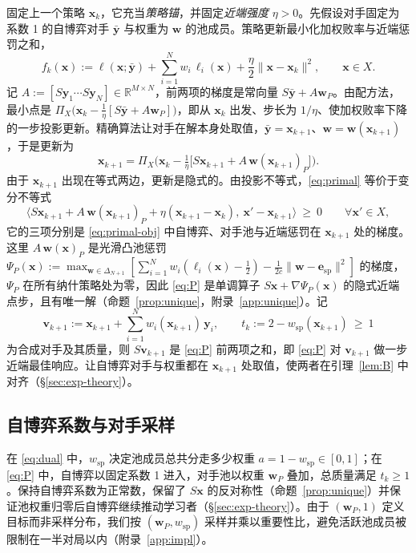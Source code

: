\documentclass{article}
\theoremstyle{plain}
\theoremstyle{remark}
\newcommand{\Proj}{\Pi}
\newcommand{\simplex}{\Delta}
\newcommand{\bx}{{\bm{x}}}
\newcommand{\by}{{\bm{y}}}
\newcommand{\bv}{{\bm{v}}}
\newcommand{\bw}{{\bm{w}}}
\newcommand{\be}{{\bm{e}}}
\newcommand{\esp}{\be_{\mathrm{sp}}}
\newcommand{\wsp}{w_{\mathrm{sp}}}
\begin{document}
固定上一个策略 $\bx_k$，它充当\emph{策略锚}，并固定\emph{近端强度} $\eta>0$。先假设对手固定为系数 1 的自博弈对手 $\bar{\by}$ 与权重为 $\bw$ 的池成员。策略更新最小化加权败率与近端惩罚之和，
\begin{equation}
f_k(\bx):=\ell(\bx;\bar{\by})+\sum_{i=1}^Nw_i\,\ell_i(\bx)+\frac\eta2\|\bx-\bx_k\|^2,\qquad \bx\in X .
\label{eq:primal-obj}
\end{equation}
记 $A:=[S\by_1\cdots S\by_N]\in\mathbb R^{M\times N}$，前两项的梯度是常向量 $S\bar{\by}+A\bw_P$。由配方法，最小点是 $\Proj_X\big(\bx_k-\tfrac1\eta[S\bar{\by}+A\bw_P]\big)$，即从 $\bx_k$ 出发、步长为 $1/\eta$、使加权败率下降的一步投影更新。精确算法让对手在解本身处取值，$\bar{\by}=\bx_{k+1}$、$\bw=\bw(\bx_{k+1})$，于是更新为
\begin{equation}
\bx_{k+1}=\Proj_X\Big(\bx_k-\tfrac1\eta\big[S\bx_{k+1}+A\,\bw(\bx_{k+1})_P\big]\Big).
\label{eq:primal}
\end{equation}
由于 $\bx_{k+1}$ 出现在等式两边，更新是隐式的。由投影不等式，\eqref{eq:primal} 等价于变分不等式
\begin{equation}
\big\langle S\bx_{k+1}+A\,\bw(\bx_{k+1})_P+\eta(\bx_{k+1}-\bx_k),\ \bx'-\bx_{k+1}\big\rangle\ \ge\ 0\qquad\forall \bx'\in X ,
\label{eq:P}
\end{equation}
它的三项分别是 \eqref{eq:primal-obj} 中自博弈、对手池与近端惩罚在 $\bx_{k+1}$ 处的梯度。这里 $A\,\bw(\bx)_P$ 是光滑凸池惩罚 $\Psi_P(\bx):=\max_{\bw\in\simplex_{N+1}}[\sum_{i=1}^Nw_i(\ell_i(\bx)-\tfrac12)-\tfrac1{2c}\|\bw-\esp\|^2]$ 的梯度，$\Psi_P$ 在所有纳什策略处为零，因此 \eqref{eq:P} 是单调算子 $S\bx+\nabla\Psi_P(\bx)$ 的隐式近端点步，且有唯一解（命题~\ref{prop:unique}，附录~\ref{app:unique}）。记
\[
\bv_{k+1}:=\bx_{k+1}+\sum_{i=1}^Nw_i(\bx_{k+1})\,\by_i,\qquad t_k:=2-\wsp(\bx_{k+1})\ \ge\ 1
\]
为合成对手及其质量，则 $S\bv_{k+1}$ 是 \eqref{eq:P} 前两项之和，即 \eqref{eq:P} 对 $\bv_{k+1}$ 做一步近端最佳响应。让自博弈对手与权重都在 $\bx_{k+1}$ 处取值，使两者在引理~\ref{lem:B} 中对齐（\S\ref{sec:exp-theory}）。

\subsection{自博弈系数与对手采样}
\label{sec:share}

在 \eqref{eq:dual} 中，$\wsp$ 决定池成员总共分走多少权重 $a=1-\wsp\in[0,1]$；在 \eqref{eq:P} 中，自博弈以固定系数 1 进入，对手池以权重 $\bw_P$ 叠加，总质量满足 $t_k\ge1$。保持自博弈系数为正常数，保留了 $S\bx$ 的反对称性（命题~\ref{prop:unique}）并保证池权重归零后自博弈继续推动学习者（\S\ref{sec:exp-theory}）。由于 $(\bw_P,1)$ 定义目标而非采样分布，我们按 $(\bw_P,\wsp)$ 采样并乘以重要性比，避免活跃池成员被限制在一半对局以内（附录~\ref{app:impl}）。
\end{document}
